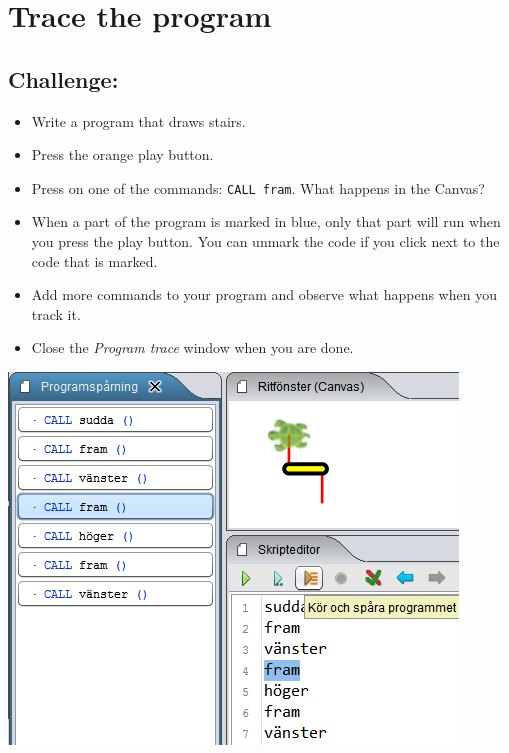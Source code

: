 \chapter{Trace the program}
\begin{multicols}{2}
\section*{\color{BrickRed}Challenge:}


\begin{itemize}

\item {Write a program that draws stairs.}
\item {Press the orange play button.}
\item {Press on one of the commands: \lstinline{CALL fram}. What happens in the Canvas?}
\item {When a part of the program is marked in blue, only that part will run when you press the play button. You can unmark the code if you click next to the code that is marked. }
\item {Add more commands to your program and observe what happens when you track it.}
\item {Close the {\it Program trace} window when you are done.}

\end{itemize}



\columnbreak

\begin{center}
\includegraphics{../img/trace.png}
\end{center}

\end{multicols}

